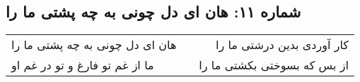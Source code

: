 \begin{center}
\section*{شماره ۱۱: هان ای دل چونی به چه پشتی ما را}
\label{sec:011}
\begin{longtable}{l p{0.5cm} r}
هان ای دل چونی به چه پشتی ما را
&&
کار آوردی بدین درشتی ما را
\\
ما از غم تو فارغ و تو در غم او
&&
از بس که بسوختی بکشتی ما را
\\
\end{longtable}
\end{center}
